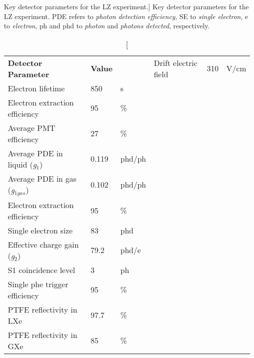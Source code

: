 \begin{table}[b!]
\centering
\caption
[Key detector parameters for the LZ experiment.]
{Key detector parameters for the LZ experiment. PDE refers to \textit{photon detection efficiency}, SE to \textit{single electron}, e to \textit{electron}, ph and phd to \textit{photon} and \textit{photons detected}, respectively.}
\label{tab:lz_parameters}
\vspace{1mm}
\renewcommand{\arraystretch}{1.2}
    \begin{tabularx}{0.7\linewidth}{@{\extracolsep{\fill}}lll}
    \toprule
    \textbf{Detector Parameter} & %
    \textbf{Value} & %
    \textbf{} & %
    \hline
    \hline

    Drift electric field                        & 310 & V/cm \\
    Electron lifetime                           & 850 & \micro{}s \\
    Electron extraction efficiency              & 95 & \% \\
    Average PMT efficiency                      & 27 & \% \\
    Average PDE in liquid (\textit{g$_{1}$})    & 0.119 & phd/ph \\
    Average PDE in gas (\textit{g$_{1gas}$})    & 0.102 & phd/ph \\
    Electron extraction efficiency              & 95 & \% \\
    Single electron size                        & 83 & phd \\
    Effective charge gain (\textit{g$_{2}$})    & 79.2 & phd/e \\
    S1 coincidence level                        & 3 & ph \\
    Single phe trigger efficiency               & 95 & \% \\
    PTFE reflectivity in LXe                    & 97.7 & \% \\
    PTFE reflectivity in GXe                    & 85 & \% \\ 
    
    \bottomrule
    \end{tabularx}
\end{table}